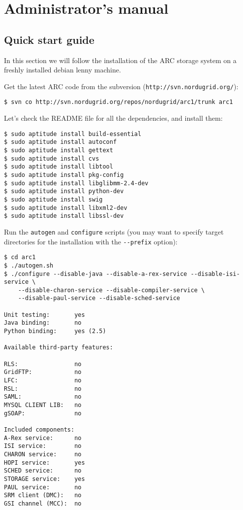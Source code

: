 \documentclass{book}
\begin{document}
\chapter{Administrator's manual} %
\label{cha:administrator_s_manual}

\section{Quick start guide} %
\label{sec:quick_start_guide}

In this section we will follow the installation of the ARC storage system on a freshly installed debian lenny machine. 

Get the latest ARC code from the subversion (\verb!http://svn.nordugrid.org/!):

\begin{verbatim}
$ svn co http://svn.nordugrid.org/repos/nordugrid/arc1/trunk arc1
\end{verbatim}

Let's check the README file for all the dependencies, and install them:

\begin{verbatim}
$ sudo aptitude install build-essential
$ sudo aptitude install autoconf
$ sudo aptitude install gettext
$ sudo aptitude install cvs
$ sudo aptitude install libtool
$ sudo aptitude install pkg-config
$ sudo aptitude install libglibmm-2.4-dev
$ sudo aptitude install python-dev
$ sudo aptitude install swig
$ sudo aptitude install libxml2-dev
$ sudo aptitude install libssl-dev
\end{verbatim}

Run the \verb!autogen! and \verb!configure! scripts (you may want to specify target directories for the installation with the \verb!--prefix! option):

\begin{verbatim}
$ cd arc1
$ ./autogen.sh
$ ./configure --disable-java --disable-a-rex-service --disable-isi-service \
    --disable-charon-service --disable-compiler-service \
    --disable-paul-service --disable-sched-service

Unit testing:       yes
Java binding:       no
Python binding:     yes (2.5)

Available third-party features:

RLS:                no
GridFTP:            no
LFC:                no
RSL:                no
SAML:               no
MYSQL CLIENT LIB:   no
gSOAP:              no

Included components:
A-Rex service:      no
ISI service:        no
CHARON service:     no
HOPI service:       yes
SCHED service:      no
STORAGE service:    yes
PAUL service:       no
SRM client (DMC):   no
GSI channel (MCC):  no

\end{verbatim}
\end{document}

